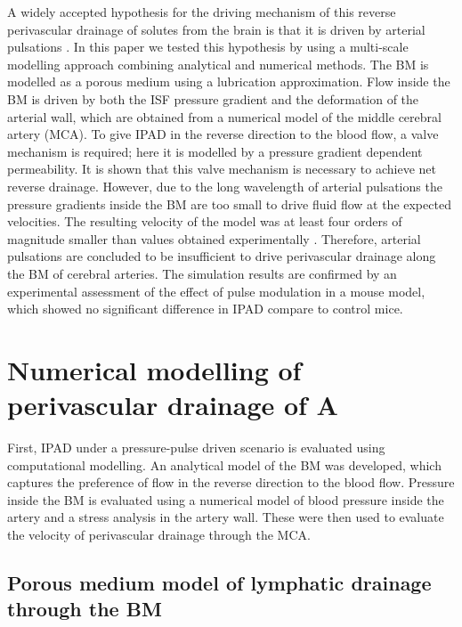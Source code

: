\documentclass{frontiersFPHY} %
\newcommand{\Ab}{A\textbeta\xspace}
\begin{document}
A widely accepted hypothesis for the driving mechanism of this reverse perivascular drainage of solutes from the brain is that it is driven by arterial pulsations \cite{Weller2009,Carare2008,Hawkes2011,Morris2014,Schley2006,Attems2011,Wang2011,Iliff2012,Asgari2015,Sharp2015,Weller2015a}. In this paper we tested this hypothesis by using a multi-scale modelling approach combining analytical and numerical methods. The BM is modelled as a porous medium using a lubrication approximation. Flow inside the BM is driven by both the ISF pressure gradient and the deformation of the arterial wall, which are obtained from a numerical model of the middle cerebral artery (MCA). To give IPAD in the reverse direction to the blood flow, a valve mechanism is required; here it is modelled by a pressure gradient dependent permeability. It is shown that this valve mechanism is necessary to achieve net reverse drainage. However, due to the long wavelength of arterial pulsations the pressure gradients inside the BM are too small to drive fluid flow at the expected velocities. The resulting velocity of the model was at least four orders of magnitude smaller than values obtained experimentally \cite{Carare2008}. Therefore, arterial pulsations are concluded to be insufficient to drive perivascular drainage along the BM of cerebral arteries. The simulation results are confirmed by an experimental assessment of the effect of pulse modulation in a mouse model, which showed no significant difference in IPAD compare to control mice.

\section{Numerical modelling of perivascular drainage of \Ab}

First, IPAD under a pressure-pulse driven scenario is evaluated using computational modelling. An analytical model of the BM was developed, which captures the preference of flow in the reverse direction to the blood flow. Pressure inside the BM is evaluated using a numerical model of blood pressure inside the artery and a stress analysis in the artery wall. These were then used to evaluate the velocity of perivascular drainage through the MCA.

\subsection{Porous medium model of lymphatic drainage through the BM}
\label{sec:diodemodel}
\end{document}
